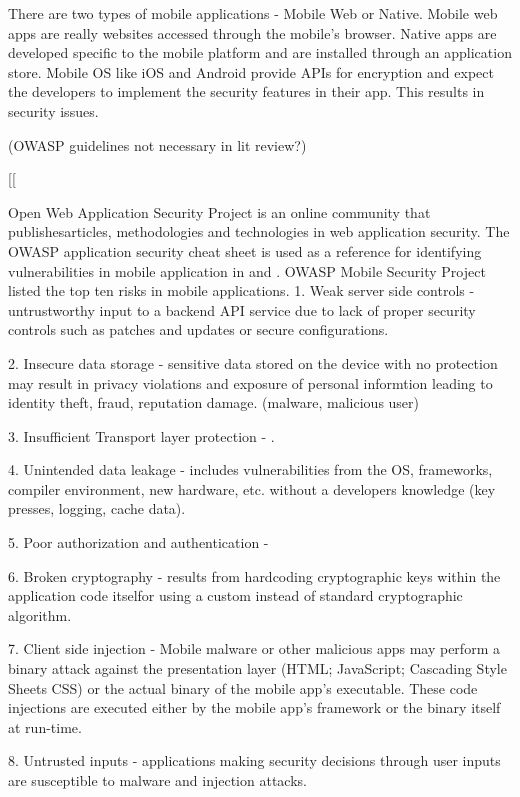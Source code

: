 \documentclass{mproj}
\begin{document}
There are two types of mobile applications - Mobile Web or Native. Mobile web apps are really websites accessed through the mobile's browser. Native apps are developed specific to the mobile platform and are installed through an application store. Mobile OS like iOS and Android provide APIs for encryption and expect the developers to implement the security features in their app. This results in security issues.

(OWASP guidelines not necessary in lit review?)

[[

Open Web Application Security Project is an online community that publishesarticles, methodologies and technologies in web application security. The OWASP application security cheat sheet is used as a reference for identifying vulnerabilities in mobile application in \cite{acharya2015} and \cite{saito2015}. OWASP Mobile Security Project listed the top ten risks in mobile applications\cite{owasp}.
1. Weak server side controls - untrustworthy input to a backend API service due to lack of proper security controls such as patches and updates or secure configurations.

2. Insecure data storage - sensitive data stored on the device with no protection may result in privacy violations and exposure of personal informtion leading to identity theft, fraud, reputation damage. (malware, malicious user)

3. Insufficient Transport layer protection - .

4. Unintended data leakage -  includes vulnerabilities from the OS, frameworks, compiler environment, new hardware, etc. without a developers knowledge (key presses, logging, cache data).

5. Poor authorization and authentication - 

6. Broken cryptography - results from hardcoding cryptographic keys within the application code itselfor using a custom instead of standard cryptographic algorithm.

7. Client side injection - Mobile malware or other malicious apps may perform a binary attack against the presentation layer (HTML; JavaScript; Cascading Style Sheets CSS) or the actual binary of the mobile app's executable. These code injections are executed either by the mobile app's framework or the binary itself at run-time.

8. Untrusted inputs - applications making security decisions through user inputs are susceptible to malware and injection attacks.
\end{document}

